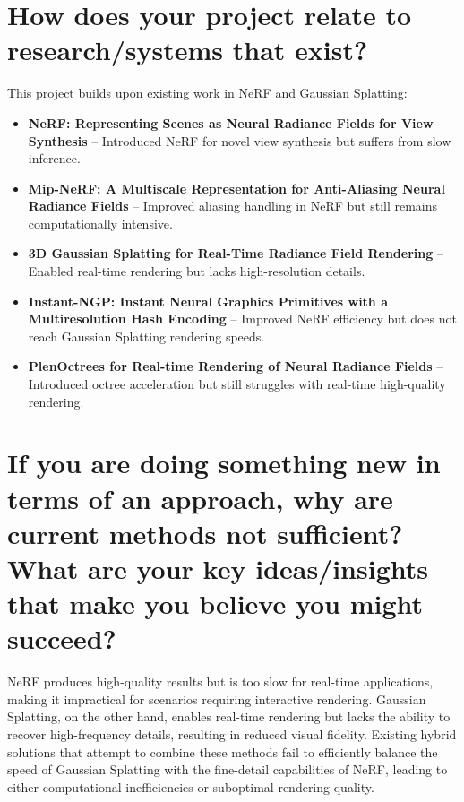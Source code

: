 \documentclass[10pt,letterpaper]{article}
\begin{document}
	\section{How does your project relate to research/systems that exist?}
	This project builds upon existing work in NeRF and Gaussian Splatting:
	\begin{itemize}
		\item \textbf{NeRF: Representing Scenes as Neural Radiance Fields for View Synthesis} \cite{mildenhall2020nerf} – Introduced NeRF for novel view synthesis but suffers from slow inference.
		\item \textbf{Mip-NeRF: A Multiscale Representation for Anti-Aliasing Neural Radiance Fields} \cite{barron2021mipnerf} – Improved aliasing handling in NeRF but still remains computationally intensive.
		\item \textbf{3D Gaussian Splatting for Real-Time Radiance Field Rendering} \cite{kerbl2023gaussians} – Enabled real-time rendering but lacks high-resolution details.
		\item \textbf{Instant-NGP: Instant Neural Graphics Primitives with a Multiresolution Hash Encoding} \cite{muller2022instantngp} – Improved NeRF efficiency but does not reach Gaussian Splatting rendering speeds.
		\item \textbf{PlenOctrees for Real-time Rendering of Neural Radiance Fields} \cite{yu2021plenoptrees} – Introduced octree acceleration but still struggles with real-time high-quality rendering.
	\end{itemize}
	
	\section{If you are doing something new in terms of an approach, why are current methods not sufficient? What are your key ideas/insights that make you believe you might succeed?}
	
	NeRF produces high-quality results but is too slow for real-time applications, making it impractical for scenarios requiring interactive rendering. Gaussian Splatting, on the other hand, enables real-time rendering but lacks the ability to recover high-frequency details, resulting in reduced visual fidelity. Existing hybrid solutions that attempt to combine these methods fail to efficiently balance the speed of Gaussian Splatting with the fine-detail capabilities of NeRF, leading to either computational inefficiencies or suboptimal rendering quality.
	
\end{document}
